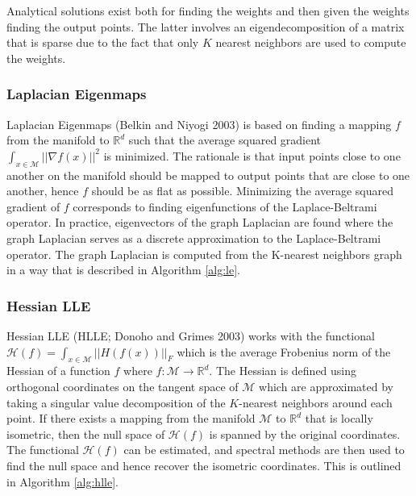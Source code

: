 \documentclass[12pt]{article}
\begin{document}
Analytical solutions exist both for finding the weights and then given the weights finding the output points. The latter involves an eigendecomposition of a matrix that is sparse due to the fact that only \(K\) nearest neighbors are used to compute the weights.

\hypertarget{laplacian-eigenmaps}{%
\subsubsection*{Laplacian Eigenmaps}\label{laplacian-eigenmaps}}

Laplacian Eigenmaps (Belkin and Niyogi 2003) is based on finding a mapping \(f\) from the manifold to \(\mathbb{R}^d\) such that the average squared gradient \(\int_{x\in\mathcal{M}}||\nabla f(x)||^2\) is minimized. The rationale is that input points close to one another on the manifold should be mapped to output points that are close to one another, hence \(f\) should be as flat as possible. Minimizing the average squared gradient of \(f\) corresponds to finding eigenfunctions of the Laplace-Beltrami operator. In practice, eigenvectors of the graph Laplacian are found where the graph Laplacian serves as a discrete approximation to the Laplace-Beltrami operator. The graph Laplacian is computed from the K-nearest neighbors graph in a way that is described in Algorithm \ref{alg:le}.

\hypertarget{hessian-lle}{%
\subsubsection*{Hessian LLE}\label{hessian-lle}}

Hessian LLE (HLLE; Donoho and Grimes 2003) works with the functional \(\mathcal{H}(f)=\int_{x\in\mathcal{M}}||H(f(x))||_F\) which is the average Frobenius norm of the Hessian of a function \(f\) where \(f:\mathcal{M}\rightarrow\mathbb{R}^d\). The Hessian is defined using orthogonal coordinates on the tangent space of \(\mathcal{M}\) which are approximated by taking a singular value decomposition of the \(K\)-nearest neighbors around each point. If there exists a mapping from the manifold \(\mathcal{M}\) to \(\mathbb{R}^d\) that is locally isometric, then the null space of \(\mathcal{H}(f)\) is spanned by the original coordinates. The functional \(\mathcal{H}(f)\) can be estimated, and spectral methods are then used to find the null space and hence recover the isometric coordinates. This is outlined in Algorithm \ref{alg:hlle}.
\end{document}
